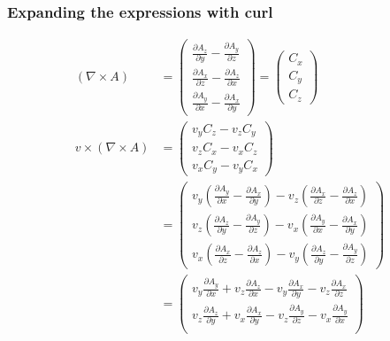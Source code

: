 \documentclass[smallextended]{svjour3}       %
\begin{document}
		
		\subsubsection{Expanding the expressions with curl}
		 \begin{align}
    \left( \nabla \times A \right) & = \begin{pmatrix}
           \frac{\partial A_z}{\partial y} - \frac{\partial A_y}{\partial z} \\
           \frac{\partial A_x}{\partial z} - \frac{\partial A_z}{\partial x} \\
           \frac{\partial A_y}{\partial x} - \frac{\partial A_x}{\partial y}
         \end{pmatrix} = \begin{pmatrix}
           C_x \\
           C_y \\
           C_z
         \end{pmatrix}\\
				v \times \left( \nabla \times A \right) & = \begin{pmatrix}
           v_y C_z
					 - v_z C_y\\
					v_z C_x
					 - v_x C_z\\
					v_x C_y
					 - v_y C_x
         \end{pmatrix}\\ & = \begin{pmatrix}
           v_y \left(\frac{\partial A_y}{\partial x} - \frac{\partial A_x}{\partial y}\right)
					 - v_z \left(\frac{\partial A_x}{\partial z} - \frac{\partial A_z}{\partial x}\right)\\
					v_z \left(\frac{\partial A_z}{\partial y} - \frac{\partial A_y}{\partial z}\right)
					 - v_x \left(\frac{\partial A_y}{\partial x} - \frac{\partial A_x}{\partial y}\right)\\
					v_x \left(\frac{\partial A_x}{\partial z} - \frac{\partial A_z}{\partial x}\right)
					 - v_y \left(\frac{\partial A_z}{\partial y} - \frac{\partial A_y}{\partial z}\right)
         \end{pmatrix}\\& = \begin{pmatrix}
           v_y \frac{\partial A_y}{\partial x} + v_z \frac{\partial A_z}{\partial x}
					- v_y \frac{\partial A_x}{\partial y} - v_z \frac{\partial A_x}{\partial z}\\
					v_z \frac{\partial A_z}{\partial y} + v_x \frac{\partial A_x}{\partial y}
					- v_z \frac{\partial A_y}{\partial z} - v_x \frac{\partial A_y}{\partial x}\\

\end{pmatrix}
\end{align}
\end{document}
